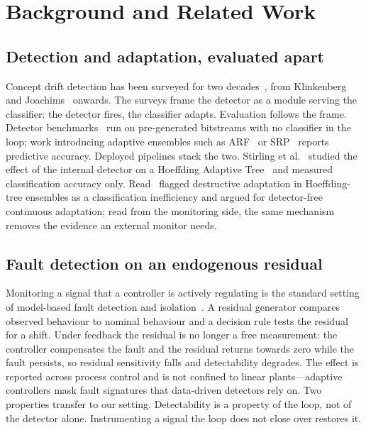 \section{Background and Related Work}\label{sec:related}

\subsection{Detection and adaptation, evaluated apart}
Concept drift detection has been surveyed for two
decades~\cite{gama_survey_2014, lu_concept_drift_2018, bayram_2022}, from
Klinkenberg and Joachims~\cite{klinkenberg_2000} onwards. The surveys frame the
detector as a module serving the classifier: the detector fires, the classifier
adapts. Evaluation follows the frame. Detector
benchmarks~\cite{goncalves_2014, lukats_2025} run on pre-generated bitstreams
with no classifier in the loop; work introducing adaptive ensembles such as
ARF~\cite{gomes_arf_2017} or SRP~\cite{gomes_srp_2019} reports predictive
accuracy. Deployed pipelines stack the two. Stirling et
al.~\cite{stirling_2018} studied the effect of the internal detector on a
Hoeffding Adaptive Tree~\cite{bifet_hat_2009} and measured classification
accuracy only. Read~\cite{read_2018} flagged destructive adaptation in
Hoeffding-tree ensembles as a classification inefficiency and argued for
detector-free continuous adaptation; read from the monitoring side, the same
mechanism removes the evidence an external monitor needs.

\subsection{Fault detection on an endogenous residual}
Monitoring a signal that a controller is actively regulating is the standard
setting of model-based fault detection and isolation~\cite{chen_patton_1999,
gertler_1998, isermann_2006, blanke_2006}. A residual generator compares
observed behaviour to nominal behaviour and a decision rule tests the residual
for a shift. Under feedback the residual is no longer a free measurement: the
controller compensates the fault and the residual returns towards zero while the
fault persists, so residual sensitivity falls and detectability degrades. The
effect is reported across process control and is not confined to linear
plants---adaptive controllers mask fault signatures that data-driven detectors
rely on. Two properties transfer to our setting. Detectability is a property of
the loop, not of the detector alone. Instrumenting a signal the loop does not
close over restores it.


